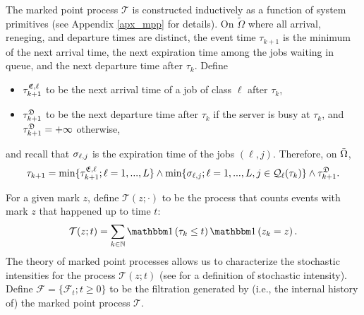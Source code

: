 \documentclass{article}
\theoremstyle{definition}
\numberwithin{equation}{section}
\begin{document}
The marked point process $\mathcal{T}$ is constructed inductively as a function of system primitives (see Appendix \ref{apx_mpp} for details). On $\tilde\Omega$ where all arrival, reneging, and departure times are distinct, the event time $\tau_{k+1}$ is the minimum of the next arrival time, the next expiration time among the jobs waiting in queue, and the next departure time after $\tau_k$. Define
\begin{itemize}
  \item $\tau^{\mathfrak{E},\ell}_{k+1}$ to be the next arrival time of a job of class $\ell$ after $\tau_{k}$,
  \item $\tau^{\mathfrak{D}}_{k+1}$ to be the next departure time after $\tau_k$ if the server is busy at $\tau_k$, and $\tau^{\mathfrak{D}}_{k+1}=+\infty$ otherwise,
\end{itemize}
and recall that $\sigma_{\ell,j}$ is the expiration time of the jobs $(\ell,j)$. Therefore, on $\tilde \Omega$,
\begin{equation}\label{next_event}
  \tau_{k+1}= \min\{\tau^{\mathfrak{E},\ell}_{k+1};\ell=1,...,L\} \wedge \min\{\sigma_{\ell,j}; \ell=1,...,L,j\in\mathcal{Q}_\ell(\tau_k) \} \wedge \tau^{\mathfrak{D}}_{k+1}.
\end{equation}




For a given mark $z$, define $\mathcal{T}(z;\cdot)$ to be the process that counts events with mark $z$ that happened up to time $t$:
\begin{equation}\label{def_mark_count}
    \mathcal{T}(z;t)= \sum_{k\in\N} \indic{\tau_k\leq t}\indic{z_k=z}.
\end{equation}
The theory of marked point processes allows us to characterize the stochastic intensities for the process $\mathcal{T}(z;t)$ (see \cite[Definition II.D7]{BremaudBook} for a definition of stochastic intensity). Define $\mathcal{F}=\{\mathcal{F}_t;t\geq0\}$ to be the filtration generated by (i.e., the internal history of) the marked point process $\mathcal{T}$.
\end{document}
